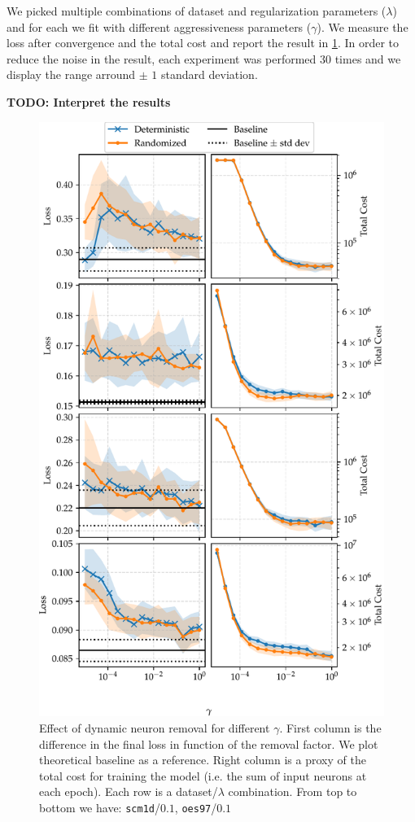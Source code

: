 We picked multiple combinations of dataset and regularization parameters ($\lambda$) and for each we fit with different aggressiveness parameters ($\gamma$). We measure the loss after convergence and the total cost and report the result in \cref{neuron_removal_figure}. In order to reduce the noise in the result, each experiment was performed $30$ times and we display the range arround $\pm$ $1$ standard deviation.

\textbf{TODO: Interpret the results}
\begin{figure}
\begin{center}
\includegraphics[width=\columnwidth]{neuron_removal}
\vspace*{-5mm}
\caption{\label{neuron_removal_figure}Effect of dynamic neuron removal for different $\gamma$. First column is the difference in the final loss in function of the removal factor. We plot theoretical baseline as a reference. Right column is a proxy of the total cost for training the model (i.e. the sum of input neurons at each epoch). Each row is a dataset/$\lambda$ combination. From top to bottom we have: \texttt{scm1d}/$0.1$, \texttt{oes97}/$0.1$}


\end{center}
\end{figure}
